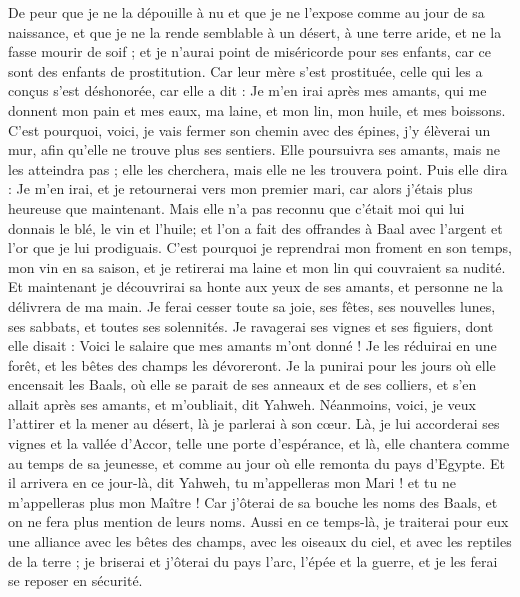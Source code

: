 \begin{multicols}{2}
De peur que je ne la dépouille à nu et que je ne l'expose comme au jour de sa naissance, et que je ne la rende semblable à un désert, à une terre aride, et ne la fasse mourir de soif ;
et je n'aurai point de miséricorde pour ses enfants, car ce sont des enfants de prostitution.
Car leur mère s'est prostituée, celle qui les a conçus s'est déshonorée, car elle a dit : Je m'en irai après mes amants, qui me donnent mon pain et mes eaux, ma laine, et mon lin, mon huile, et mes boissons.
C'est pourquoi, voici, je vais fermer son chemin avec des épines, j'y élèverai un mur, afin qu'elle ne trouve plus ses sentiers.
Elle poursuivra ses amants, mais ne les atteindra pas ; elle les cherchera, mais elle ne les trouvera point. Puis elle dira : Je m'en irai, et je retournerai vers mon premier mari, car alors j'étais plus heureuse que maintenant.
Mais elle n'a pas reconnu que c'était moi qui lui donnais le blé, le vin et l'huile; et l'on a fait des offrandes à Baal avec l'argent et l'or que je lui prodiguais.
C'est pourquoi je reprendrai mon froment en son temps, mon vin en sa saison, et je retirerai ma laine et mon lin qui couvraient sa nudité.
Et maintenant je découvrirai sa honte aux yeux de ses amants, et personne ne la délivrera de ma main.
Je ferai cesser toute sa joie, ses fêtes, ses nouvelles lunes, ses sabbats, et toutes ses solennités.
Je ravagerai ses vignes et ses figuiers, dont elle disait : Voici le salaire que mes amants m'ont donné ! Je les réduirai en une forêt, et les bêtes des champs les dévoreront.
Je la punirai pour les jours où elle encensait les Baals, où elle se parait de ses anneaux et de ses colliers, et s'en allait après ses amants, et m'oubliait, dit Yahweh.
Néanmoins, voici, je veux l'attirer et la mener au désert, là je parlerai à son cœur.
Là, je lui accorderai ses vignes et la vallée d'Accor, telle une porte d'espérance, et là, elle chantera comme au temps de sa jeunesse, et comme au jour où elle remonta du pays d'Egypte.
 Et il arrivera en ce jour-là, dit Yahweh, tu m'appelleras mon Mari ! et tu ne m'appelleras plus mon Maître !
Car j'ôterai de sa bouche les noms des Baals, et on ne fera plus mention de leurs noms.
Aussi en ce temps-là, je traiterai pour eux une alliance avec les bêtes des champs, avec les oiseaux du ciel, et avec les reptiles de la terre ; je briserai et j'ôterai du pays l'arc, l'épée et la guerre, et je les ferai se reposer en sécurité.

\end{multicols}
